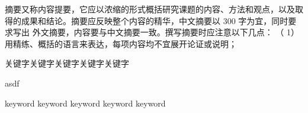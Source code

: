 \begin{cabstract}

摘要又称内容提要，它应以浓缩的形式概括研究课题的内容、方法和观点，以及取
得的成果和结论。摘要应反映整个内容的精华，中文摘要以 300 字为宜，同时要求写出
外文摘要，内容要与中文摘要一致。撰写摘要时应注意以下几点：
（ 1）用精练、概括的语言来表达，每项内容均不宜展开论证或说明；

\end{cabstract}

\begin{ckeywords}
  关键字\quad 关键字\quad 关键字\quad 关键字\quad 关键字
\end{ckeywords}

\begin{eabstract}
asdf

\end{eabstract}

\begin{ekeywords}
  keyword \quad keyword \quad keyword \quad keyword \quad keyword
\end{ekeywords}

